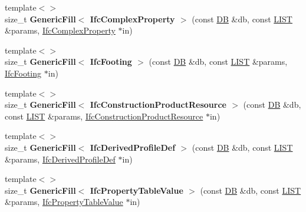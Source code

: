 \begin{DoxyCompactItemize}
\item 
\hypertarget{namespace_assimp_1_1_s_t_e_p_ac7a7b4b026d0d5f22b8ea7bf931d3517}{{\footnotesize template$<$$>$ }\\size\+\_\+t {\bfseries Generic\+Fill$<$ Ifc\+Complex\+Property $>$} (const \hyperlink{class_assimp_1_1_s_t_e_p_1_1_d_b}{D\+B} \&db, const \hyperlink{class_assimp_1_1_s_t_e_p_1_1_e_x_p_r_e_s_s_1_1_l_i_s_t}{L\+I\+S\+T} \&params, \hyperlink{struct_assimp_1_1_i_f_c_1_1_ifc_complex_property}{Ifc\+Complex\+Property} $\ast$in)}\label{namespace_assimp_1_1_s_t_e_p_ac7a7b4b026d0d5f22b8ea7bf931d3517}

\item 
\hypertarget{namespace_assimp_1_1_s_t_e_p_a00f2b90477c40f6415113ae969bd7b09}{{\footnotesize template$<$$>$ }\\size\+\_\+t {\bfseries Generic\+Fill$<$ Ifc\+Footing $>$} (const \hyperlink{class_assimp_1_1_s_t_e_p_1_1_d_b}{D\+B} \&db, const \hyperlink{class_assimp_1_1_s_t_e_p_1_1_e_x_p_r_e_s_s_1_1_l_i_s_t}{L\+I\+S\+T} \&params, \hyperlink{struct_assimp_1_1_i_f_c_1_1_ifc_footing}{Ifc\+Footing} $\ast$in)}\label{namespace_assimp_1_1_s_t_e_p_a00f2b90477c40f6415113ae969bd7b09}

\item 
\hypertarget{namespace_assimp_1_1_s_t_e_p_a2725de50c6f272ac0414590d69658111}{{\footnotesize template$<$$>$ }\\size\+\_\+t {\bfseries Generic\+Fill$<$ Ifc\+Construction\+Product\+Resource $>$} (const \hyperlink{class_assimp_1_1_s_t_e_p_1_1_d_b}{D\+B} \&db, const \hyperlink{class_assimp_1_1_s_t_e_p_1_1_e_x_p_r_e_s_s_1_1_l_i_s_t}{L\+I\+S\+T} \&params, \hyperlink{struct_assimp_1_1_i_f_c_1_1_ifc_construction_product_resource}{Ifc\+Construction\+Product\+Resource} $\ast$in)}\label{namespace_assimp_1_1_s_t_e_p_a2725de50c6f272ac0414590d69658111}

\item 
\hypertarget{namespace_assimp_1_1_s_t_e_p_a0b800127428a68a59b1ee39c7491015d}{{\footnotesize template$<$$>$ }\\size\+\_\+t {\bfseries Generic\+Fill$<$ Ifc\+Derived\+Profile\+Def $>$} (const \hyperlink{class_assimp_1_1_s_t_e_p_1_1_d_b}{D\+B} \&db, const \hyperlink{class_assimp_1_1_s_t_e_p_1_1_e_x_p_r_e_s_s_1_1_l_i_s_t}{L\+I\+S\+T} \&params, \hyperlink{struct_assimp_1_1_i_f_c_1_1_ifc_derived_profile_def}{Ifc\+Derived\+Profile\+Def} $\ast$in)}\label{namespace_assimp_1_1_s_t_e_p_a0b800127428a68a59b1ee39c7491015d}

\item 
\hypertarget{namespace_assimp_1_1_s_t_e_p_aad6fd1000a111b1ebaca7f1e3340dba0}{{\footnotesize template$<$$>$ }\\size\+\_\+t {\bfseries Generic\+Fill$<$ Ifc\+Property\+Table\+Value $>$} (const \hyperlink{class_assimp_1_1_s_t_e_p_1_1_d_b}{D\+B} \&db, const \hyperlink{class_assimp_1_1_s_t_e_p_1_1_e_x_p_r_e_s_s_1_1_l_i_s_t}{L\+I\+S\+T} \&params, \hyperlink{struct_assimp_1_1_i_f_c_1_1_ifc_property_table_value}{Ifc\+Property\+Table\+Value} $\ast$in)}\label{namespace_assimp_1_1_s_t_e_p_aad6fd1000a111b1ebaca7f1e3340dba0}


\end{DoxyCompactItemize}
